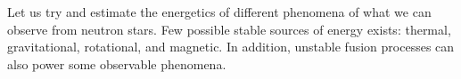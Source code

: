 %
%
%


Let us try and estimate the energetics of different phenomena of what we can observe from neutron stars.
Few possible stable sources of energy exists: thermal, gravitational, rotational, and magnetic.
In addition, unstable fusion processes can also power some observable phenomena.



